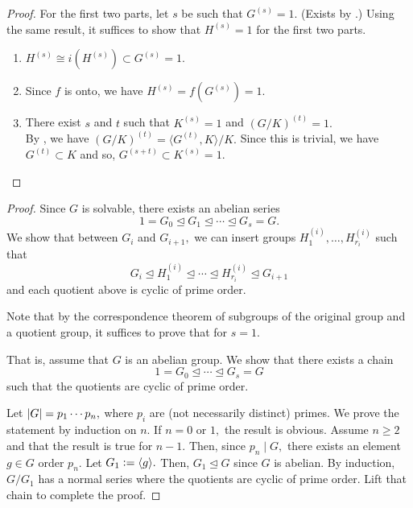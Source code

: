\twoofthreesolvable*\label{prop:twoofthreesolvable2}
\begin{flushright}\hyperref[prop:twoofthreesolvable]{\upsym}\end{flushright}
\begin{proof}
    For the first two parts, let $s$ be such that $G^{(s)} = 1.$ (Exists by .) Using the same result, it suffices to show that $H^{(s)} = 1$ for the first two parts.
    \begin{enumerate}
        \item $H^{(s)} \cong i(H^{(s)}) \subset G^{(s)} = 1.$
        \item Since $f$ is onto, we have $H^{(s)} = f(G^{(s)}) = 1.$
        \item There exist $s$ and $t$ such that $K^{(s)} = 1$ and $(G/K)^{(t)} = 1.$\\
        By , we have $(G/K)^{(t)} = \langle G^{(t)}, K\rangle/K.$ Since this is trivial, we have $G^{(t)} \subset K$ and so, $G^{(s + t)} \subset K^{(s)} = 1.$ \qedhere
    \end{enumerate}
\end{proof}

\label{prop:refiningabelianseries2}
\begin{flushright}\hyperref[prop:refiningabelianseries]{\upsym}\end{flushright}
\begin{proof}
    Since $G$ is solvable, there exists an abelian series
    \begin{equation*} 
        1 = G_0 \unlhd G_1 \unlhd \cdots \unlhd G_s = G.
    \end{equation*}
    We show that between $G_i$ and $G_{i + 1},$ we can insert groups $H_1^{(i)}, \ldots, H_{r_i}^{(i)}$ such that 
    \begin{equation*} 
        G_i \unlhd H_1^{(i)} \unlhd \cdots \unlhd H_{r_i}^{(i)} \unlhd G_{i + 1}
    \end{equation*}
    and each quotient above is cyclic of prime order.

    Note that by the correspondence theorem of subgroups of the original group and a quotient group, it suffices to prove that for $s = 1.$

    That is, assume that $G$ is an abelian group. We show that there exists a chain
    \begin{equation*} 
        1 = G_0 \unlhd \cdots \unlhd G_s = G
    \end{equation*}
    such that the quotients are cyclic of prime order.

    Let ${\left\lvert G \right\lvert} = p_1 \cdots p_n,$ where $p_i$ are (not necessarily distinct) primes. We prove the statement by induction on $n.$ If $n = 0$ or $1,$ the result is obvious. Assume $n \ge 2$ and that the result is true for $n - 1.$ Then, since $p_n \mid G,$ there exists an element $g \in G$ order $p_n.$ Let $G_1 \vcentcolon= \langle g\rangle.$ Then, $G_1 \unlhd G$ since $G$ is abelian. By induction, $G/G_1$ has a normal series where the quotients are cyclic of prime order. Lift that chain to complete the proof.
\end{proof}

